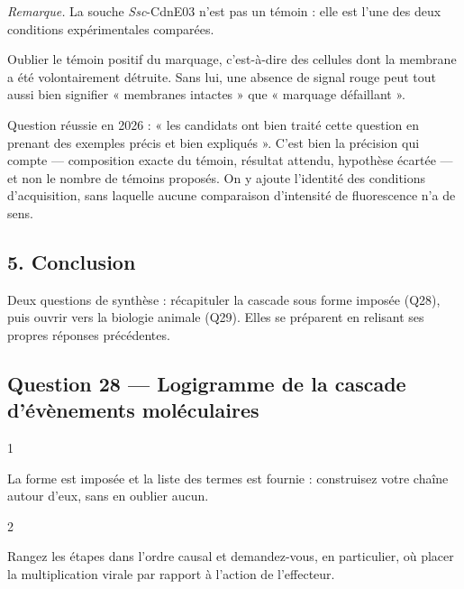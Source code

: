 \documentclass[11pt,a4paper]{article}
\begin{document}
\emph{Remarque.} La souche \emph{Ssc}-CdnE03 n'est pas un témoin : elle est l'une des deux conditions expérimentales comparées.

\begin{piege}

Oublier le témoin positif du marquage, c'est-à-dire des cellules dont la membrane a été volontairement détruite. Sans lui, une absence de signal rouge peut tout aussi bien signifier « membranes intactes » que « marquage défaillant ».

\end{piege}

\begin{jury}

Question réussie en 2026 : « les candidats ont bien traité cette question en prenant des exemples précis et bien expliqués ». C'est bien la précision qui compte --- composition exacte du témoin, résultat attendu, hypothèse écartée --- et non le nombre de témoins proposés. On y ajoute l'identité des conditions d'acquisition, sans laquelle aucune comparaison d'intensité de fluorescence n'a de sens.

\end{jury}

\hypertarget{conclusion}{%
\subsection{5. Conclusion}\label{conclusion}}

Deux questions de synthèse : récapituler la cascade sous forme imposée (Q28), puis ouvrir vers la biologie animale (Q29). Elles se préparent en relisant ses propres réponses précédentes.

\hypertarget{question-28-logigramme-de-la-cascade-duxe9vuxe8nements-moluxe9culaires}{%
\subsection{Question 28 --- Logigramme de la cascade d'évènements moléculaires}\label{question-28-logigramme-de-la-cascade-duxe9vuxe8nements-moluxe9culaires}}

\begin{indication}{1}

La forme est imposée et la liste des termes est fournie : construisez votre chaîne autour d'eux, sans en oublier aucun.

\end{indication}

\begin{indication}{2}

Rangez les étapes dans l'ordre causal et demandez-vous, en particulier, où placer la multiplication virale par rapport à l'action de l'effecteur.

\end{indication}
\end{document}
